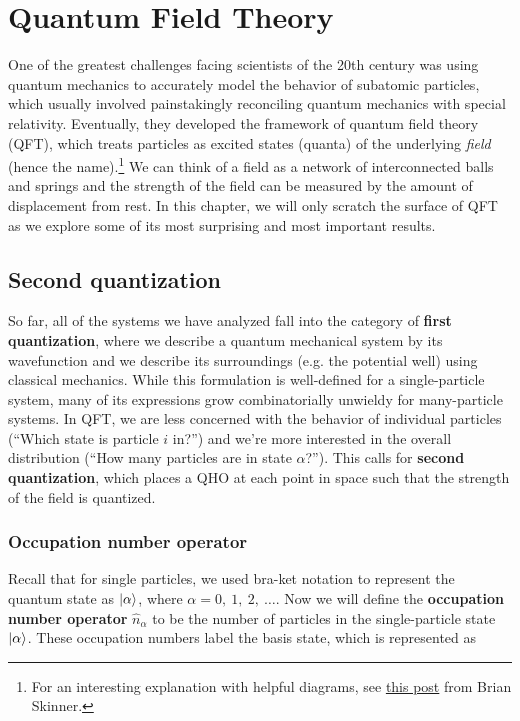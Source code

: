 %

%

\chapter{Quantum Field Theory} \label{ch:qft}
One of the greatest challenges facing scientists of the 20th century was using quantum mechanics to accurately model the behavior of subatomic particles, which usually involved painstakingly reconciling quantum mechanics with special relativity. Eventually, they developed the framework of quantum field theory (QFT), which treats particles as excited states (quanta) of the underlying \emph{field} (hence the name).\footnote{For an interesting explanation with helpful diagrams, see \href{https://www.ribbonfarm.com/2015/08/20/qft/}{this post} from Brian Skinner.} We can think of a field as a network of interconnected balls and springs and the strength of the field can be measured by the amount of displacement from rest. In this chapter, we will only scratch the surface of QFT as we explore some of its most surprising and most important results. \par 

\section{Second quantization}
So far, all of the systems we have analyzed fall into the category of \textbf{first quantization}, where we describe a quantum mechanical system by its wavefunction and we describe its surroundings (e.g. the potential well) using classical mechanics. While this formulation is well-defined for a single-particle system, many of its expressions grow combinatorially unwieldy for many-particle systems. In QFT, we are less concerned with the behavior of individual particles (``Which state is particle $i$ in?'') and we're more interested in the overall distribution (``How many particles are in state $\alpha$?''). This calls for \textbf{second quantization}, which places a QHO at each point in space such that the strength of the field is quantized. \par 

\subsection{Occupation number operator}
Recall that for single particles, we used bra-ket notation to represent the quantum state as $\ket{\alpha}$, where $\alpha = 0,\ 1,\ 2,\ \dots$. Now we will define the \textbf{occupation number operator} $\hat{n}_{\alpha}$ to be the number of particles in the single-particle state $\ket{\alpha}$. These occupation numbers label the basis state, which is represented as

